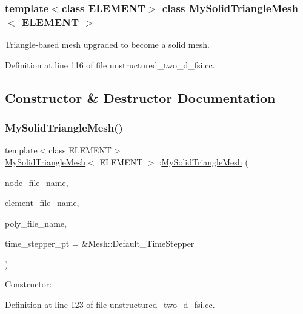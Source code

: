 \subsubsection*{template$<$class E\+L\+E\+M\+E\+NT$>$\newline
class My\+Solid\+Triangle\+Mesh$<$ E\+L\+E\+M\+E\+N\+T $>$}

Triangle-\/based mesh upgraded to become a solid mesh. 

Definition at line 116 of file unstructured\+\_\+two\+\_\+d\+\_\+fsi.\+cc.



\subsection{Constructor \& Destructor Documentation}
\mbox{\label{classMySolidTriangleMesh_a13939dc0593c5707c0099e3586161ce6}} 
\subsubsection{\texorpdfstring{My\+Solid\+Triangle\+Mesh()}{MySolidTriangleMesh()}}
{\footnotesize\ttfamily template$<$class E\+L\+E\+M\+E\+NT$>$ \\
\hyperlink{classMySolidTriangleMesh}{My\+Solid\+Triangle\+Mesh}$<$ E\+L\+E\+M\+E\+NT $>$\+::\hyperlink{classMySolidTriangleMesh}{My\+Solid\+Triangle\+Mesh} (\begin{DoxyParamCaption}\item[{const std\+::string \&}]{node\+\_\+file\+\_\+name,  }\item[{const std\+::string \&}]{element\+\_\+file\+\_\+name,  }\item[{const std\+::string \&}]{poly\+\_\+file\+\_\+name,  }\item[{Time\+Stepper $\ast$}]{time\+\_\+stepper\+\_\+pt = {\ttfamily \&Mesh\+:\+:Default\+\_\+TimeStepper} }\end{DoxyParamCaption})\hspace{0.3cm}{\ttfamily [inline]}}



Constructor\+: 



Definition at line 123 of file unstructured\+\_\+two\+\_\+d\+\_\+fsi.\+cc.

